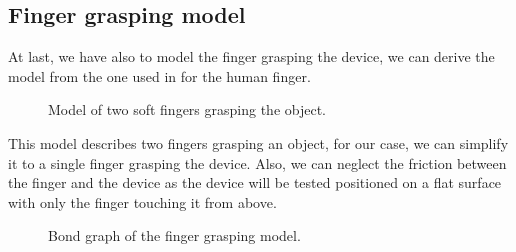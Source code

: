 \subsection{Finger grasping model}
At last, we have also to model the finger grasping the device, we can derive the model from the one used in \cite{Finger_grasping_model} for the human finger.

\begin{figure}
    \centering
    \caption{Model of two soft fingers grasping the object.}
    \label{fig: Finger grasping model}
\end{figure}

This model describes two fingers grasping an object, for our case, we can simplify it to a single finger grasping the device.
Also, we can neglect the friction between the finger and the device as the device will be tested positioned on a flat surface with only the finger touching it from above.
\begin{figure}
    \centering
    \resizebox{.9\linewidth}{!}{
        
    }
    \caption{Bond graph of the finger grasping model.}
    \label{fig: Finger grasping bond graph}
\end{figure}
